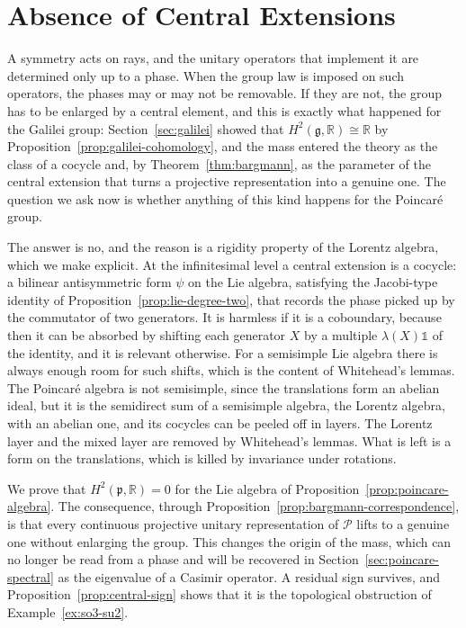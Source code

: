 	\section{Absence of Central Extensions}
	\label{sec:poincare-cohomology}
	
	A symmetry acts on rays, and the unitary operators that implement it are determined only up to a phase. When the group law is imposed on such operators, the phases may or may not be removable. If they are not, the group has to be enlarged by a central element, and this is exactly what happened for the Galilei group: Section~\ref{sec:galilei} showed that $H^2(\mathfrak{g},\mathbb{R})\cong\mathbb{R}$ by Proposition~\ref{prop:galilei-cohomology}, and the mass entered the theory as the class of a cocycle and, by Theorem~\ref{thm:bargmann}, as the parameter of the central extension that turns a projective representation into a genuine one. The question we ask now is whether anything of this kind happens for the Poincar\'e group.
	
	The answer is no, and the reason is a rigidity property of the Lorentz algebra, which we make explicit. At the infinitesimal level a central extension is a cocycle: a bilinear antisymmetric form $\psi$ on the Lie algebra, satisfying the Jacobi-type identity of Proposition~\ref{prop:lie-degree-two}, that records the phase picked up by the commutator of two generators. It is harmless if it is a coboundary, because then it can be absorbed by shifting each generator $X$ by a multiple $\lambda(X)\mathbb{1}$ of the identity, and it is relevant otherwise. For a semisimple Lie algebra there is always enough room for such shifts, which is the content of Whitehead's lemmas. The Poincar\'e algebra is not semisimple, since the translations form an abelian ideal, but it is the semidirect sum of a semisimple algebra, the Lorentz algebra, with an abelian one, and its cocycles can be peeled off in layers. The Lorentz layer and the mixed layer are removed by Whitehead's lemmas. What is left is a form on the translations, which is killed by invariance under rotations.
	
	We prove that $H^2(\mathfrak{p},\mathbb{R})=0$ for the Lie algebra of Proposition~\ref{prop:poincare-algebra}. The consequence, through Proposition~\ref{prop:bargmann-correspondence}, is that every continuous projective unitary representation of $\mathcal{P}$ lifts to a genuine one without enlarging the group. This changes the origin of the mass, which can no longer be read from a phase and will be recovered in Section~\ref{sec:poincare-spectral} as the eigenvalue of a Casimir operator. A residual sign survives, and Proposition~\ref{prop:central-sign} shows that it is the topological obstruction of Example~\ref{ex:so3-su2}.
	
